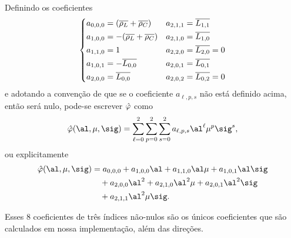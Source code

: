 Definindo os coeficientes \[ \left\{
\begin{aligned}
a_{0,0,0} &= (\overline{\rho_L}+ \overline{\rho_C})     & a_{2,1,1} &=
\overline{L_{1,1}}\\
a_{1,0,0} &= - (\overline{\rho_L} + \overline{\rho_C})   & a_{2,1,0} &=
\overline{L_{1,0}}\\
a_{1,1,0} &= 1 				    & a_{2,2,0} &= \overline{L_{2,0}}=0\\
a_{1,0,1} &= -  \overline{L_{0,0}} & a_{2,0,1} &= \overline{L_{0,1}}\\
a_{2,0,0} &=  \overline{L_{0,0}} & a_{2,0,2} &= \overline{L_{0,2}}=0\\
\end{aligned}\right.	
\]
e adotando a convenção de que se o coeficiente  $a_{\ell,p,s}$ não está definido
acima, então será nulo, pode-se escrever $\hat{\varphi}$ como
\[
\nextphi(\al,\mu,\sig) = \sum_{\ell= 0}^2\sum_{p=0}^2 
\sum_{s=0}^2a_{\ell,p,s}\al^\ell\mu^p\sig^s,
\]   
ou explicitamente
\begin{equation}
\begin{aligned}
\nextphi(\al,\mu,\sig) & = 	a_{0,0,0} + a_{1,0,0}\al + a_{1,1,0}\al\mu + 
a_{1,0,1}\al\sig  
\\
&\quad + a_{2,0,0}\al^2
 + a_{2,1,0}\al^2\mu   + a_{2,0,1}\al^2\sig\\ 
& \quad + a_{2,1,1}\al^2\mu\sig.
\end{aligned}
\label{eq:varphi-poly-form}
\end{equation}

Esses 8 
coeficientes de três índices  não-nulos são
os únicos coeficientes que são calculados em nossa implementação, além das
direções.

% 



